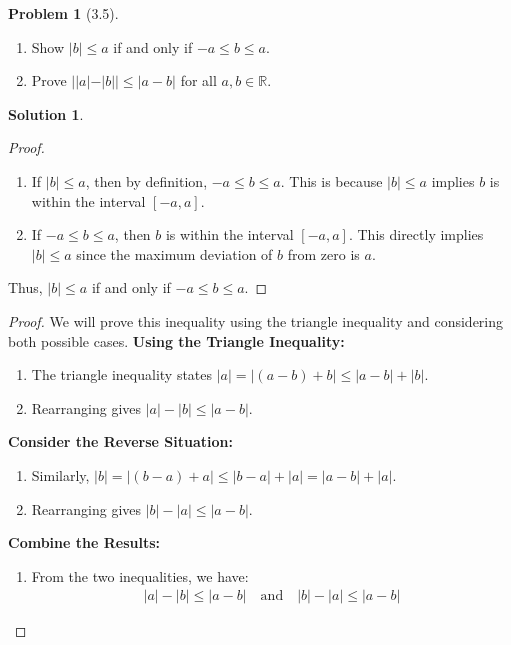 \documentclass[12pt]{article}
\theoremstyle{definition} %
\newtheorem{solution}{Solution}
\newtheorem{problem}{Problem}
\theoremstyle{plain} %
\begin{document}
  
  \begin{problem}[3.5]
      \begin{enumerate}
          \item Show $|b|\leq a$ if and only if $-a\leq b\leq a$.
          \item Prove $||a|-|b||\leq|a-b|$ for all $a,b \in \mathbb{R}$.
      \end{enumerate}
  \end{problem}
  
  \begin{solution}
   \begin{proof}
          \begin{enumerate}
              \item If $|b| \leq a$, then by definition, $-a \leq b \leq a$. This is because $|b| \leq a$ implies $b$ is within the interval $[-a, a]$.
              \item If $-a \leq b \leq a$, then $b$ is within the interval $[-a, a]$. This directly implies $|b| \leq a$ since the maximum deviation of $b$ from zero is $a$.
          \end{enumerate}
          Thus, $|b| \leq a$ if and only if $-a \leq b \leq a$. 
      \end{proof}
      \begin{proof}
          We will prove this inequality using the triangle inequality and considering both possible cases.
    \textbf{Using the Triangle Inequality:}
              \begin{enumerate}
                  \item The triangle inequality states $|a| = |(a - b) + b| \leq |a - b| + |b|$.
                  \item Rearranging gives $|a| - |b| \leq |a - b|$.
              \end{enumerate}
              
            \textbf{Consider the Reverse Situation:}
              \begin{enumerate}
                  \item Similarly, $|b| = |(b - a) + a| \leq |b - a| + |a| = |a - b| + |a|$.
                  \item Rearranging gives $|b| - |a| \leq |a - b|$.
              \end{enumerate}
              
               \textbf{Combine the Results:}
              \begin{enumerate}
                  \item From the two inequalities, we have:
                  \begin{align}
                  |a| - |b| \leq |a - b| \quad \text{and} \quad |b| - |a| \leq |a - b|
                  \end{align}
              \end{enumerate}
              

\end{proof}
\end{solution}
\end{document}
